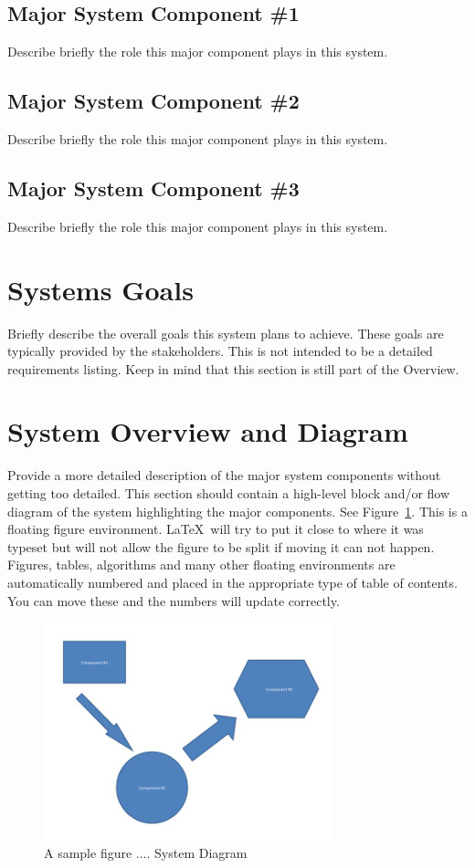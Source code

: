 \subsection{Major System Component \#1}
Describe briefly the role this major component plays in this system. 

\subsection{Major System Component \#2}
Describe briefly the role this major component plays in this system. 

\subsection{Major System Component \#3}
Describe briefly the role this major component plays in this system. 

\section{Systems Goals}
Briefly describe the overall goals this system plans to achieve.
These goals are typically provided by the stakeholders.  This is not
intended to be a detailed requirements listing.  Keep in mind that
this section is still part of the Overview.

\section{System Overview and Diagram}
Provide a more detailed description of the major system components
without getting too detailed.  This section should contain a
high-level block and/or flow diagram of the system highlighting the
major components.  See Figure~\ref{systemdiagram}.  This is a floating
figure environment.  \LaTeX\ will try to put it close to where it was
typeset but will not allow the figure to be split if moving it can not
happen.  Figures, tables, algorithms and many other floating
environments are automatically numbered and placed in the appropriate
type of table of contents.  You can move these and the numbers will
update correctly.

\begin{figure}[tbh]
\begin{center}
\includegraphics[width=0.75\textwidth]{./diagram}
\end{center}
\caption{A sample figure .... System Diagram \label{systemdiagram}}
\end{figure}

